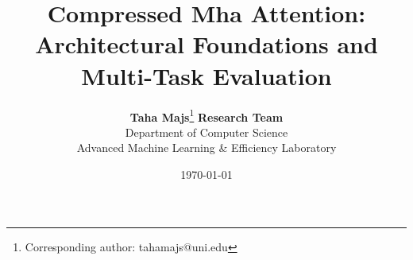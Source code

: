 \title{\textbf{Compressed Mha Attention: Architectural Foundations and Multi-Task Evaluation}}

\author{
  \textbf{Taha Majs}\thanks{Corresponding author: tahamajs@uni.edu} \quad \textbf{Research Team} \\
  Department of Computer Science \\
  Advanced Machine Learning \& Efficiency Laboratory
}

\date{\today}
